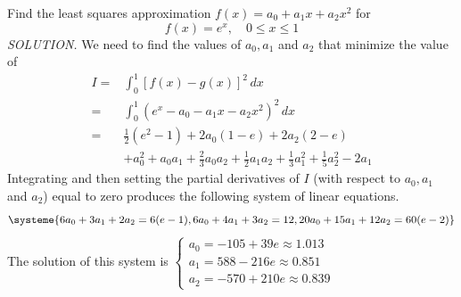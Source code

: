 \documentclass{article}
\newcommand\ddfrac[2]{\frac{\displaystyle #1}{\displaystyle #2}}
\begin{document}
    Find the least squares approximation $f(x) = a_0 + a_1x + a_2x^2$ for
    \[f(x) = e^x, \quad 0 \le x \le 1\]
    \textit{ \textcolor{blue5}{SOLUTION.} } We need to find the values of $a_0, a_1$ and $a_2$ that minimize the value of
    \begin{equation*}
        \begin{split}
            I =& \int_0^1 [f(x) - g(x)]^2\,dx \\
            =& \int_0^1 (e^x - a_0 - a_1x - a_2x^2)^2\,dx \\
            =& \ddfrac{1}{2}(e^2 - 1) + 2a_0(1 - e) + 2a_2(2 - e)\\
             & + a_0^2 + a_0a_1 + \ddfrac{2}{3}a_0a_2 + \ddfrac{1}{2}a_1a_2 + \ddfrac{1}{3}a_1^2 + 
             \ddfrac{1}{5}a_2^2 - 2a_1
        \end{split}
    \end{equation*}
    Integrating and then setting the partial derivatives of $I$ (with respect to $a_0, a_1$ and $a_2$) equal to zero produces
    the following system of linear equations.
    \[ \systeme {
            6a_0 + 3a_1 + 2a_2 = 6(e - 1),
            6a_0 + 4a_1 + 3a_2 = 12,
            20a_0 + 15a_1 + 12a_2 = 60(e - 2)
        } \]
        The solution of this system is $\begin{cases}
            a_0 = -105 + 39e \approx 1.013 \\
            a_1 = 588 - 216e \approx 0.851 \\
            a_2 = -570 + 210e \approx 0.839
      \end{cases}$
\end{document}
